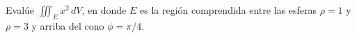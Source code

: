 \item Evalúe $\iiint_E x^2 \, dV$, en donde $E$ es la región comprendida entre las esferas $\rho = 1$ y $\rho = 3$ y arriba del cono $\phi = \pi/4$.
